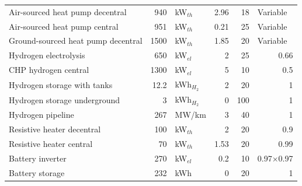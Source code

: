 \documentclass[preprint,12pt]{elsarticle}
\begin{document}
\begin{table}[htbp]
\begin{tabular}{lrlrrr}
    Air-sourced heat pump decentral           & 940                                                                                         & kW$_{th}$ & 2.96 & 18 & \multicolumn{1}{l}{Variable} \\
    Air-sourced heat pump central             & 951                                                                                         & kW$_{th}$ & 0.21 & 25 & \multicolumn{1}{l}{Variable} \\
    Ground-sourced heat pump decentral        & 1500                                                                                        & kW$_{th}$ & 1.85 & 20 & \multicolumn{1}{l}{Variable} \\
    Hydrogen electrolysis                    & 650                                                                                         & kW$_{el}$ & 2    & 25 & 0.66 \\
    CHP hydrogen central                      & 1300                                                                                        & kW$_{el}$ & 5    & 10 & 0.5 \\
    Hydrogen storage with tanks              & 12.2                                                                                        & kWh$_{H_2}$ & 2 & 20 & 1 \\
    Hydrogen storage underground             & 3                                                                                           & kWh$_{H_2}$ & 0 & 100 & 1 \\
    Hydrogen pipeline                         & 267                                                                                         & MW/km     & 3    & 40 & 1 \\
    Resistive heater decentral                & 100                                                                                         & kW$_{th}$ & 2    & 20 & 0.9 \\
    Resistive heater central                  & 70                                                                                          & kW$_{th}$ & 1.53 & 20 & 0.99 \\
    Battery inverter                          & 270                                                                                         & kW$_{el}$ & 0.2  & 10 & \multicolumn{1}{l}{0.97$\times$0.97} \\
    Battery storage                           & 232                                                                                         & kWh       & 0    & 20 & 1 \\

\end{tabular}
\end{table}
\end{document}
